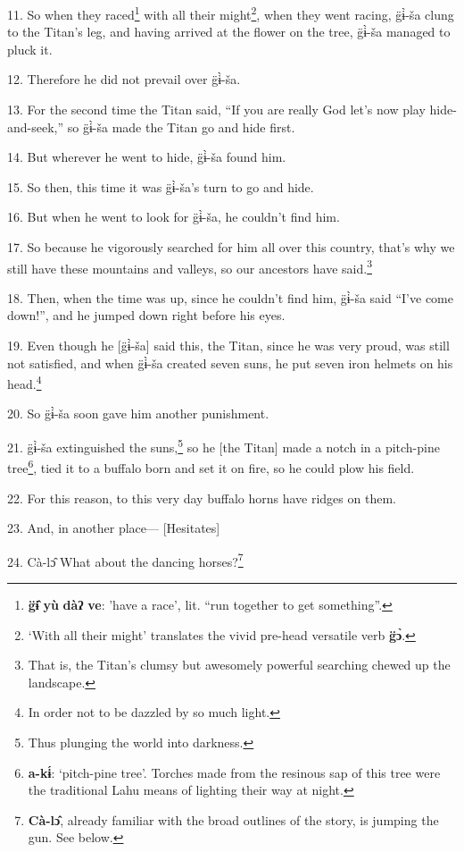 11. So when they raced\footnote{\textbf{g̈ɨ̂} \textbf{yù} \textbf{dàʔ} \textbf{ve}: 'have a race', lit. ``run together to get something''.} with all their might\footnote{`With all their might' translates the vivid pre-head versatile verb \textbf{g̈ɔ̀}.}, when they went racing, g̈ɨ̀-ša
clung to the Titan's leg, and having arrived at the flower on the tree, g̈ɨ̀-ša
managed to pluck it.

12. Therefore he did not prevail over g̈ɨ̀-ša.

13. For the second time the Titan said, ``If you are really God let's now play
hide-and-seek,'' so g̈ɨ̀-ša made the Titan go and hide first.

14. But wherever he went to hide, g̈ɨ̀-ša found him.

15. So then, this time it was g̈ɨ̀-ša's turn to go and hide.

16. But when he went to look for g̈ɨ̀-ša, he couldn't find him.

17. So because he vigorously searched for him all over this country, that's why
we still have these mountains and valleys, so our ancestors have said.\footnote{That is, the Titan's clumsy but awesomely powerful searching chewed up the landscape.}

18. Then, when the time was up, since he couldn't find him, g̈ɨ̀-ša said ``I've
come down!'', and he jumped down right before his eyes.

19. Even though he [g̈ɨ̀-ša] said this, the Titan, since he was very proud,
was still not satisfied, and when g̈ɨ̀-ša created seven suns, he put seven
iron helmets on his head.\footnote{In order not to be dazzled by so much light.}

20. So g̈ɨ̀-ša soon gave him another punishment.

21. g̈ɨ̀-ša extinguished the suns,\footnote{Thus plunging the world into darkness.} so he [the Titan] made a notch in a
pitch-pine tree\footnote{\textbf{a-kɨ́}: `pitch-pine tree'. Torches made from the resinous sap of this tree were the traditional Lahu means of lighting their way at night.}, tied it to a buffalo born and set it on fire, so he could
plow his field.

22. For this reason, to this very day buffalo horns have ridges on them.

23. And, in another place--- [Hesitates]

24. Cà-lɔ̂  What about the dancing horses?\footnote{\textbf{Cà-lɔ̂}, already familiar with the broad outlines of the story, is jumping the gun. See below.}

